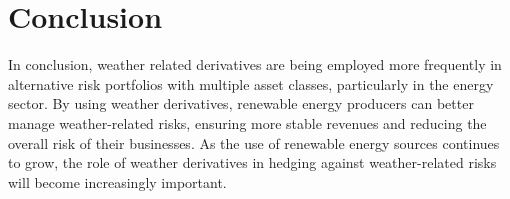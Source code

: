 \section{Conclusion}
\label{sec:weather_conclusion}

    In conclusion, weather related derivatives are being employed more frequently in alternative risk portfolios with
    multiple asset classes, particularly in the energy sector.
    By using weather derivatives, renewable energy producers can better manage weather-related risks,
    ensuring more stable revenues and reducing the overall risk of their businesses.
    As the use of renewable energy sources continues to grow,
    the role of weather derivatives in hedging against weather-related risks will become increasingly important.






